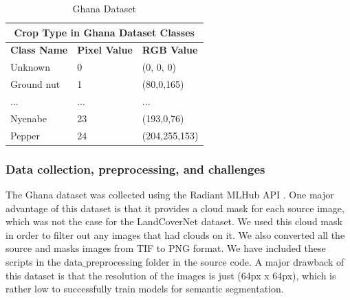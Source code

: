 \documentclass[conference]{IEEEtran}
\begin{document}

\begin{table}[htbp]
\centering
\caption{Ghana Dataset}
\begin{tabular}{|p{2.2cm}|p{0.7cm}|p{1.6cm}|}
 \hline
 \multicolumn{3}{|c|}{\textbf{Crop Type in Ghana Dataset Classes}} \\
 \hline
 \textbf{Class Name} & \textbf{Pixel Value}& \textbf{RGB Value} \\
 \hline
  Unknown & 0  &  (0, 0, 0)\\ 
 \hline
  Ground nut & 1  & (80,0,165) \\ 
 \hline
  ... & ...  & ...\\ 
 \hline
  Nyenabe & 23 & (193,0,76)\\ 
 \hline
  Pepper & 24 & (204,255,153)\\ 
 \hline
\end{tabular}
\label{ghana_dataset_class_table}
\end{table}


\subsubsection{Data collection, preprocessing, and challenges}
The Ghana dataset was collected using the Radiant MLHub API \cite{radiant_mlhub_api}.
One major advantage of this dataset is that it provides a cloud mask for each source image, which was not the case for the LandCoverNet dataset. We used this cloud mask in order to filter out any images that had clouds on it. We also converted all the source and masks images from TIF to PNG format. We have included these scripts in the data$\_$preprocessing folder in the source code. A major drawback of this dataset is that the resolution of the images is just (64px x 64px), which is rather low to successfully train models for semantic segmentation.
\end{document}
